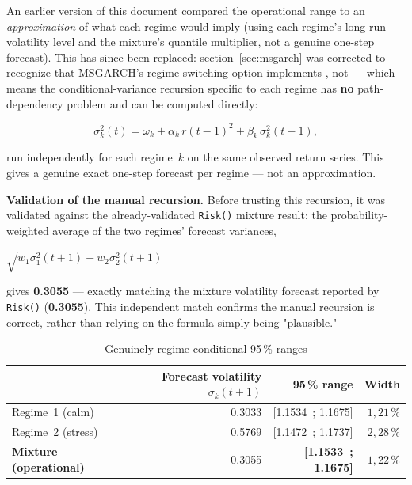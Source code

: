 \documentclass[12pt,a4paper]{article}
\begin{document}
An earlier version of this document compared the operational
range to an \emph{approximation} of what each regime would
imply (using each regime's long-run volatility level and the
mixture's quantile multiplier, not a genuine one-step
forecast). This has since been replaced: section~\ref{sec:msgarch}
was corrected to recognize that MSGARCH's
regime-switching option implements
\citet{haasmittnikpaolella2004}, not \citet{gray1996} --- which
means the conditional-variance recursion specific to each
regime has \textbf{no} path-dependency problem and can
be computed directly:

\vspace{0.3cm}

\begin{keyeq}
	\begin{equation}
		\sigma_k^2(t) = \omega_k + \alpha_k\, r(t-1)^2 + \beta_k\, 	\sigma_k^2(t-1),
	\end{equation}
\end{keyeq}

run independently for each regime~$k$ on the same observed
return series. This gives a genuine exact one-step forecast
per regime --- not an approximation.

\textbf{Validation of the manual recursion.} Before trusting
this recursion, it was validated against the already-validated
\texttt{Risk()} mixture result: the probability-weighted average of the
two regimes' forecast variances,

\vspace{0.3cm}

\begin{center}
	
	$\sqrt{w_1\sigma_1^2(t+1) + w_2\sigma_2^2(t+1)}$
	
\end{center}

\vspace{0.3cm}
gives
\textbf{0.3055} --- exactly matching the mixture
volatility forecast reported by \texttt{Risk()} (\textbf{0.3055}).
This independent match confirms the manual recursion
is correct, rather than relying on the formula simply
being "plausible."

\vspace{0.3cm}

\begin{table}[H]
	\centering
	\caption{Genuinely regime-conditional 95\,\% ranges}
	\begin{tabular}{lrrr}
		\toprule
		& Forecast volatility $\sigma_k(t+1)$ & 95\,\% range & Width \\
		\midrule
		Regime~1 (calm) & 0.3033 & [1.1534~; 1.1675] & $1{,}21\,\%$ \\
		Regime~2 (stress) & 0.5769 & [1.1472~; 1.1737] & $2{,}28\,\%$ \\
		\textbf{Mixture (operational)} & 0.3055 & \textbf{[1.1533~; 1.1675]} & \textbf{$1{,}22\,\%$} \\
		\bottomrule
	\end{tabular}
\end{table}
\end{document}
